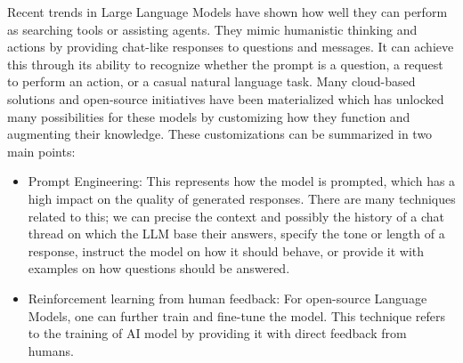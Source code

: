 Recent trends in Large Language Models have shown how well they can perform as searching tools or assisting agents. They mimic humanistic thinking and actions by providing chat-like responses to questions and messages. It can achieve this through its ability to recognize whether the prompt is a question, a request to perform an action, or a casual natural language task. Many cloud-based solutions and open-source initiatives have been materialized which has unlocked many possibilities for these models by customizing how they function and augmenting their knowledge.
These customizations can be summarized in two main points:
\begin{itemize}
    \item Prompt Engineering: This represents how the model is prompted, which has a high impact on the quality of generated responses. There are many techniques related to this; we can precise the context and possibly the history of a chat thread on which the LLM base their answers, specify the tone or length of a response, instruct the model on how it should behave, or provide it with examples on how questions should be answered.
    \item Reinforcement learning from human feedback: For open-source Language Models, one can further train and fine-tune the model. This technique refers to the training of AI model by providing it with direct feedback from humans.
\end{itemize}
\newpage


